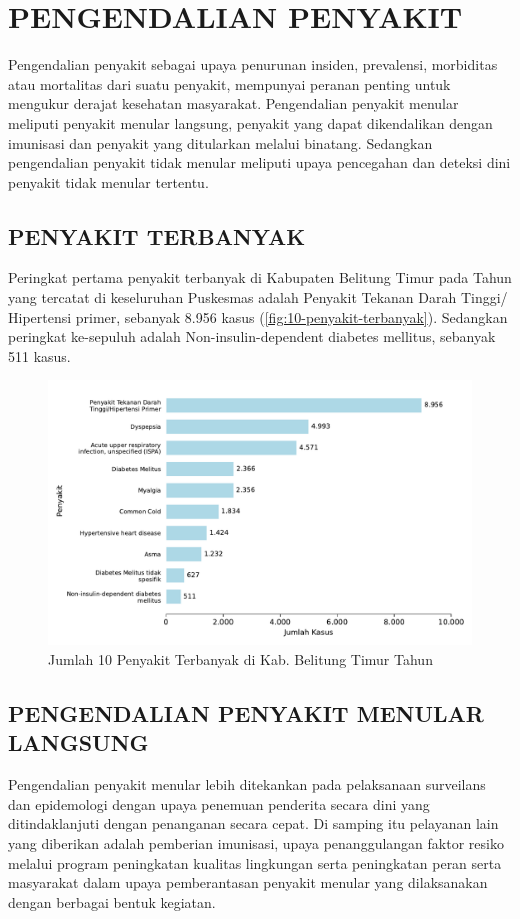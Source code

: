\chapter{PENGENDALIAN PENYAKIT}
Pengendalian penyakit sebagai upaya penurunan insiden, prevalensi, morbiditas atau mortalitas dari suatu penyakit, mempunyai peranan penting untuk mengukur derajat kesehatan masyarakat. Pengendalian penyakit menular meliputi penyakit menular langsung, penyakit yang dapat dikendalikan dengan imunisasi dan penyakit yang ditularkan melalui binatang. Sedangkan pengendalian penyakit tidak menular meliputi upaya pencegahan dan deteksi dini penyakit tidak menular tertentu.

\section{PENYAKIT TERBANYAK}
Peringkat pertama penyakit terbanyak di Kabupaten Belitung Timur pada Tahun \tP yang tercatat di keseluruhan Puskesmas adalah Penyakit Tekanan Darah Tinggi/ Hipertensi primer, sebanyak 8.956 kasus (\autoref{fig:10-penyakit-terbanyak}).
Sedangkan peringkat ke-sepuluh adalah Non-insulin-dependent diabetes
mellitus, sebanyak 511 kasus.

\begin{figure}[H]
    \centering
    \includegraphics[width=\textwidth]{bab_06/bab_06_00_penyakitTerbanyak}
    \caption{Jumlah 10 Penyakit Terbanyak di Kab. Belitung Timur Tahun \tP}
    \label{fig:10-penyakit-terbanyak}
\end{figure}

\section[PENGENDALIAN PM]{PENGENDALIAN PENYAKIT MENULAR LANGSUNG}
Pengendalian penyakit menular lebih ditekankan pada pelaksanaan surveilans dan epidemologi dengan upaya penemuan penderita secara dini yang ditindaklanjuti dengan penanganan secara cepat. Di samping itu pelayanan lain yang diberikan adalah pemberian imunisasi, upaya penanggulangan faktor resiko melalui program peningkatan kualitas lingkungan serta peningkatan peran serta masyarakat dalam upaya pemberantasan penyakit menular yang dilaksanakan dengan berbagai bentuk kegiatan.

